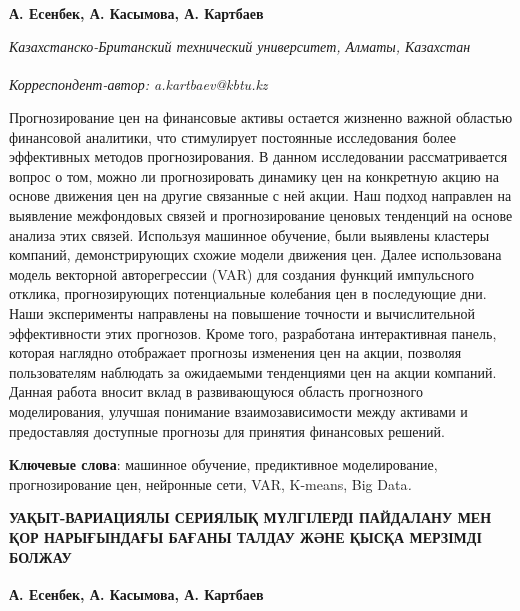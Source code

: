 
\begin{articleheader}

{\bfseries А. Есенбек,
А. Касымова,
А. Картбаев\textsuperscript{\envelope } }
\end{articleheader}

\begin{affiliation}
\emph{Казахстанско-Британский технический университет, Алматы, Казахстан}

\raggedright {\bfseries \textsuperscript{\envelope }}{\em Корреспондент-автор: a.kartbaev@kbtu.kz}
\end{affiliation}

Прогнозирование цен на финансовые активы остается жизненно важной
областью финансовой аналитики, что стимулирует постоянные исследования
более эффективных методов прогнозирования. В данном исследовании
рассматривается вопрос о том, можно ли прогнозировать динамику цен на
конкретную акцию на основе движения цен на другие связанные с ней акции.
Наш подход направлен на выявление межфондовых связей и прогнозирование
ценовых тенденций на основе анализа этих связей. Используя машинное
обучение, были выявлены кластеры компаний, демонстрирующих схожие модели
движения цен. Далее использована модель векторной авторегрессии (VAR)
для создания функций импульсного отклика, прогнозирующих потенциальные
колебания цен в последующие дни. Наши эксперименты направлены на
повышение точности и вычислительной эффективности этих прогнозов. Кроме
того, разработана интерактивная панель, которая наглядно отображает
прогнозы изменения цен на акции, позволяя пользователям наблюдать за
ожидаемыми тенденциями цен на акции компаний. Данная работа вносит вклад
в развивающуюся область прогнозного моделирования, улучшая понимание
взаимозависимости между активами и предоставляя доступные прогнозы для
принятия финансовых решений.

{\bfseries Ключевые слова}: машинное обучение, предиктивное моделирование,
прогнозирование цен, нейронные сети, VAR, K-means, Big Data\emph{.}

\begin{articleheader}
{\bfseries УАҚЫТ-ВАРИАЦИЯЛЫ СЕРИЯЛЫҚ МҮЛГІЛЕРДІ ПАЙДАЛАНУ МЕН ҚОР НАРЫҒЫНДАҒЫ БАҒАНЫ ТАЛДАУ ЖӘНЕ ҚЫСҚА МЕРЗІМДІ БОЛЖАУ}

{\bfseries
А. Есенбек,
А. Касымова,
А. Картбаев\textsuperscript{\envelope }}
\end{articleheader}

